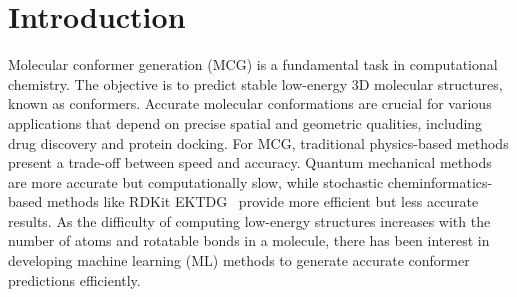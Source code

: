 \section{Introduction}



Molecular conformer generation (MCG) is a fundamental task in computational chemistry. The objective is to predict stable low-energy 3D molecular structures, known as conformers. 
Accurate molecular conformations are crucial for various applications that depend on precise spatial and geometric qualities, including drug discovery and protein docking.
For MCG, traditional physics-based methods present a trade-off between speed and accuracy. Quantum mechanical methods are more accurate but computationally slow, while stochastic cheminformatics-based methods like RDKit EKTDG~\citep{rdkit} provide more efficient but less accurate results.
As the difficulty of computing low-energy structures increases with the number of atoms and rotatable bonds in a molecule, there has been interest in developing machine learning (ML) methods to generate accurate conformer predictions efficiently. 


